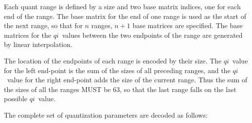 \documentclass[9pt,letterpaper]{book}
\newcommand{\idx}[1]{{\ensuremath{\mathit{#1}}}}
\newcommand{\qi}{\idx{qi}}
\numberwithin{equation}{chapter}
\numberwithin{figure}{chapter}
\numberwithin{table}{chapter}
\begin{document}
Each quant range is defined by a size and two base matrix indices, one for each
 end of the range.
The base matrix for the end of one range is used as the start of the next
 range, so that for $n$ ranges, $n+1$ base matrices are specified.
The base matrices for the \qi\ values between the two endpoints of the range
 are generated by linear interpolation.


The location of the endpoints of each range is encoded by their size.
The \qi\ value for the left end-point is the sum of the sizes of all preceding
 ranges, and the \qi\ value for the right end-point adds the size of the
 current range.
Thus the sum of the sizes of all the ranges MUST be 63, so that the last range
 falls on the last possible \qi\ value.

The complete set of quantization parameters are decoded as follows:
\end{document}

